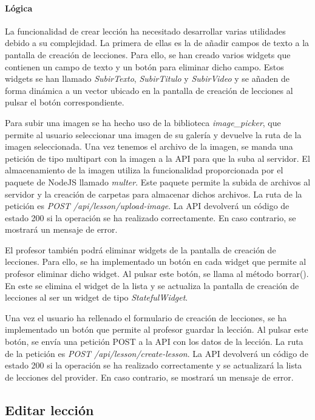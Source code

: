 \paragraph*{Lógica}
La funcionalidad de crear lección ha necesitado desarrollar varias utilidades debido a su complejidad. 
La primera de ellas es la de añadir campos de texto a la pantalla de creación de lecciones. 
Para ello, se han creado varios widgets que contienen un campo de texto y un botón para eliminar dicho campo. 
Estos widgets se han llamado \textit{SubirTexto}, \textit{SubirTitulo} y \textit{SubirVideo} y se añaden de forma dinámica a un vector ubicado 
en la pantalla de creación de lecciones al pulsar el botón correspondiente.

Para subir una imagen se ha hecho uso de la biblioteca \textit{image\_picker}, que permite al usuario seleccionar una imagen de su galería y
devuelve la ruta de la imagen seleccionada. Una vez tenemos el archivo de la imagen, se manda una petición de tipo multipart con la imagen a la API para que la suba al servidor.
El almacenamiento de la imagen utiliza la funcionalidad proporcionada por el paquete de NodeJS llamado \textit{multer}. 
Este paquete permite la subida de archivos al servidor y la creación de carpetas para almacenar dichos archivos.
La ruta de la petición es \textit{POST /api/lesson/upload-image}. La API devolverá un código de estado 200 si la operación se ha realizado correctamente. 
En caso contrario, se mostrará un mensaje de error.

El profesor también podrá eliminar widgets de la pantalla de creación de lecciones.
 Para ello, se ha implementado un botón en cada widget que permite al profesor eliminar dicho widget. Al pulsar este botón, se llama al método borrar(). 
 En este se elimina el widget de la lista y se actualiza la pantalla de creación de lecciones al ser un widget de tipo \textit{StatefulWidget}.

Una vez el usuario ha rellenado el formulario de creación de lecciones, se ha implementado un botón que permite al profesor guardar la lección. 
Al pulsar este botón, se envía una petición POST a la API con los datos de la lección. La ruta de la petición es \textit{POST /api/lesson/create-lesson}. 
La API devolverá un código de estado 200 si la operación se ha realizado correctamente y se actualizará la lista de lecciones del provider. 
En caso contrario, se mostrará un mensaje de error.


\subsection{Editar lección} 

